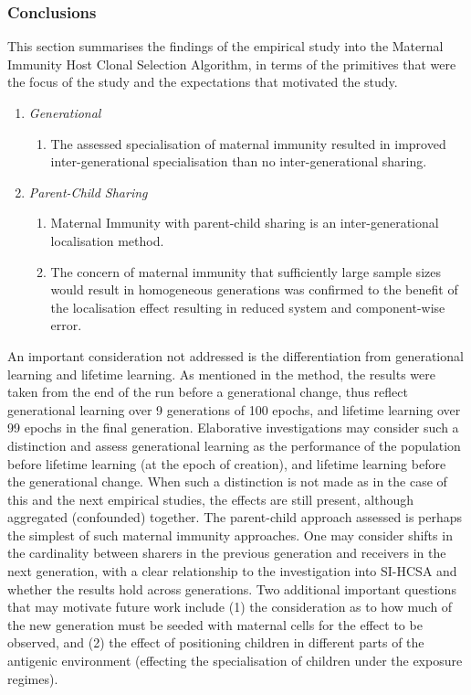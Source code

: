 \subsubsection{Conclusions}
This section summarises the findings of the empirical study into the Maternal Immunity Host Clonal Selection Algorithm, in terms of the primitives that were the focus of the study and the expectations that motivated the study.

\begin{enumerate}
	\item \emph{Generational}
	\begin{enumerate}
		\item The assessed specialisation of maternal immunity resulted in improved inter-generational specialisation than no inter-generational sharing.
	\end{enumerate}
	
	\item \emph{Parent-Child Sharing}
	\begin{enumerate}
		\item Maternal Immunity with parent-child sharing is an inter-generational localisation method.
		\item The concern of maternal immunity that sufficiently large sample sizes would result in homogeneous generations was confirmed to the benefit of the localisation effect resulting in reduced system and component-wise error.
	\end{enumerate}	
\end{enumerate}

An important consideration not addressed is the differentiation from generational learning and lifetime learning. As mentioned in the method, the results were taken from the end of the run before a generational change, thus reflect generational learning over 9 generations of 100 epochs, and lifetime learning over 99 epochs in the final generation. Elaborative investigations may consider such a distinction and assess generational learning as the performance of the population before lifetime learning (at the epoch of creation), and lifetime learning before the generational change. When such a distinction is not made as in the case of this and the next empirical studies, the effects are still present, although aggregated (confounded) together.
The parent-child approach assessed is perhaps the simplest of such maternal immunity approaches. One may consider shifts in the cardinality between sharers in the previous generation and receivers in the next generation, with a clear relationship to the investigation into SI-HCSA and whether the results hold across generations. Two additional important questions that may motivate future work include (1) the consideration as to how much of the new generation must be seeded with maternal cells for the effect to be observed, and (2) the effect of positioning children in different parts of the antigenic environment (effecting the specialisation of children under the exposure regimes).

